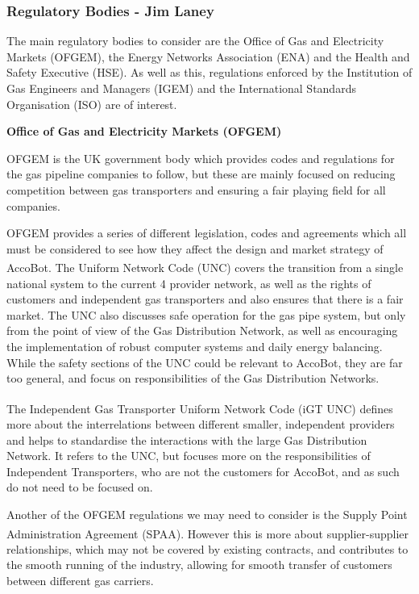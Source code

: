 \documentclass[11pt]{article}		%
\newcommand{\supercite}[1]{\textsuperscript{\cite{#1}}}		%
\begin{document}
		\subsubsection[Regulatory Bodies]{Regulatory Bodies - Jim Laney} 
		\label{govermentreg}
			
			The main regulatory bodies to consider are the Office of Gas and Electricity Markets (OFGEM), the Energy Networks Association (ENA) and the Health and Safety Executive (HSE).
			As well as this, regulations enforced by the Institution of Gas Engineers and Managers (IGEM) and the International Standards Organisation (ISO) are of interest.
 			
 			\textbf{Office of Gas and Electricity Markets (OFGEM)}
 			
			OFGEM is the UK government body which provides codes and regulations for the gas pipeline companies to follow, but these are mainly focused on reducing competition between gas transporters and ensuring a fair playing field for all companies.
			
			OFGEM provides a series of different legislation, codes and agreements which all must be considered to see how they affect the design and market strategy of AccoBot.
			The Uniform Network Code (UNC)\supercite{joint2005uniform} covers the transition from a single national system to the current 4 provider network, as well as the rights of customers and independent gas transporters and also ensures that there is a fair market.
			The UNC also discusses safe operation for the gas pipe system, but only from the point of view of the Gas Distribution Network, as well as encouraging the implementation of robust computer systems and daily energy balancing.
			While the safety sections of the UNC could be relevant to AccoBot, they are far too general, and focus on responsibilities of the Gas Distribution Networks.
			
			The Independent Gas Transporter Uniform Network Code (iGT UNC)\supercite{igt2021independent} defines more about the interrelations between different smaller, independent providers and helps to standardise the interactions with the large Gas Distribution Network.
			It refers to the UNC, but focuses more on the responsibilities of Independent Transporters, who are not the customers for AccoBot, and as such do not need to be focused on.
			
			Another of the OFGEM regulations we may need to consider is the Supply Point Administration Agreement (SPAA)\supercite{spaa2021supply}. 
			However this is more about supplier-supplier relationships, which may not be covered by existing contracts, and contributes to the smooth running of the industry, allowing for smooth transfer of customers between different gas carriers.
			
\end{document}
